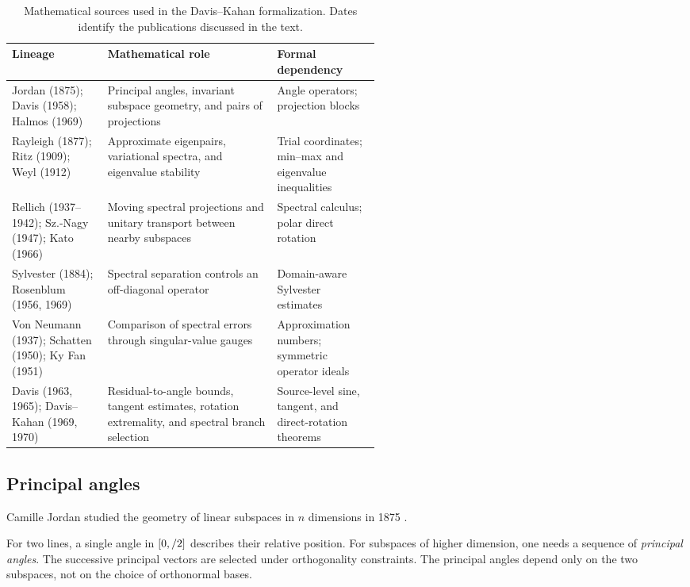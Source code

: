 \documentclass[pdflatex]{sn-jnl} %
\theoremstyle{thmstyleone}
\begin{document}
\begin{table}[!htbp]
\centering
\small
\setlength{\tabcolsep}{5pt}
\renewcommand{\arraystretch}{1.18}
\begin{tabularx}{\linewidth}{@{}>{\raggedright\arraybackslash}p{0.26\linewidth}>{\raggedright\arraybackslash}X>{\raggedright\arraybackslash}p{0.28\linewidth}@{}}
\toprule
\textbf{Lineage} & \textbf{Mathematical role} & \textbf{Formal dependency}\\
\midrule
Jordan (1875); Davis (1958); Halmos (1969) & Principal angles, invariant subspace geometry,
  and pairs of projections & Angle operators; projection blocks\\
Rayleigh (1877); Ritz (1909); Weyl (1912) & Approximate eigenpairs,
  variational spectra, and eigenvalue stability & Trial coordinates;
  min--max and eigenvalue inequalities\\
Rellich (1937--1942); Sz.-Nagy (1947); Kato (1966) & Moving spectral projections and unitary
  transport between nearby subspaces & Spectral calculus; polar
  direct rotation\\
Sylvester (1884); Rosenblum (1956, 1969) & Spectral separation controls an
  off-diagonal operator & Domain-aware Sylvester estimates\\
Von Neumann (1937); Schatten (1950); Ky Fan (1951) & Comparison of spectral errors
  through singular-value gauges & Approximation numbers;
  symmetric operator ideals\\
Davis (1963, 1965); Davis--Kahan (1969, 1970) & Residual-to-angle bounds, tangent estimates,
  rotation extremality, and spectral branch selection & Source-level
  sine, tangent, and direct-rotation theorems\\
\bottomrule
\end{tabularx}
\caption{Mathematical sources used in the Davis--Kahan formalization.
Dates identify the publications discussed in the text.}
\label{tab:historical-lineage}
\end{table}
\FloatBarrier

\subsection{Principal angles}
\label{sec:related-classical}

Camille Jordan studied the geometry of linear subspaces in $n$ dimensions in
  1875 \citep{jordan1875essai}.

For two lines, a single angle in $[0,\sym{PiConstant}/2]$ describes their relative position.
For subspaces of higher dimension, one needs a sequence of \emph{principal
  angles}.
The successive principal vectors are selected under orthogonality constraints.
The principal angles depend only on the two subspaces, not on the choice of
orthonormal bases.
\end{document}
